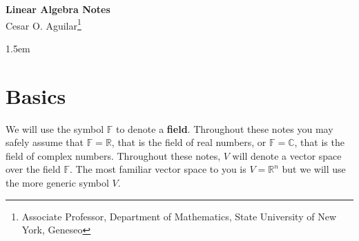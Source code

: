 \documentclass[12pt]{article}
\newcommand{\real}{\mathbb{R}}
\theoremstyle{definition}
\begin{document}
\begin{center}
\textbf{\Large Linear Algebra Notes}\\[0.5cm]
Cesar O. Aguilar\footnote{Associate Professor, Department of Mathematics, State University of New York, Geneseo}
\end{center}

\tableofcontents
\baselineskip 1.5em


\section{Basics}
We will use the symbol $\mathbb{F}$ to denote a \textbf{field}.  Throughout these notes you may safely assume that $\mathbb{F}=\real$, that is the field of real numbers, or $\mathbb{F}=\mathbb{C}$, that is the field of complex numbers.  Throughout these notes, $V$ will denote a vector space over the field $\mathbb{F}$.  The most familiar vector space to you is $V=\real^n$ but we will use the more generic symbol $V$.
\end{document}
